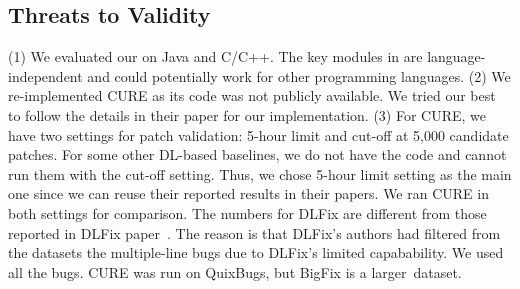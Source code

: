\subsection{Threats to Validity}



(1) We evaluated our {\tool} on Java and C/C++.  The key modules
in {\tool} are language-independent and could potentially work for
other programming languages. (2) We re-implemented CURE as its code
was not publicly available.
We tried our best to follow the details in their paper for our
implementation.
(3) For CURE, we have two settings for patch validation: 5-hour limit
and cut-off at 5,000 candidate patches. For some other DL-based
baselines, we do not have the code and cannot run them with the
cut-off setting. Thus, we chose 5-hour limit setting as the main one
since we can reuse their reported results in their papers. We ran
CURE in both settings for comparison.
The numbers for DLFix are different from those reported in
DLFix paper~\cite{icse20}. The reason is that DLFix's authors had
filtered from the datasets the multiple-line bugs due to DLFix's
limited capabability. We used all the bugs. CURE was run
on QuixBugs, but BigFix is a larger~dataset.



